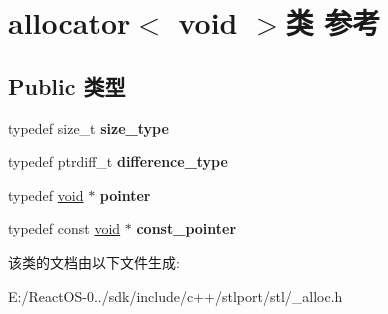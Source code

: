 \hypertarget{classallocator_3_01void_01_4}{}\section{allocator$<$ void $>$类 参考}
\label{classallocator_3_01void_01_4}
\subsection*{Public 类型}
\begin{DoxyCompactItemize}
\item 
\mbox{\label{classallocator_3_01void_01_4_a1d7526f0d0580fc47c5c3202547124f8}} 
typedef size\+\_\+t {\bfseries size\+\_\+type}
\item 
\mbox{\label{classallocator_3_01void_01_4_afe1e6b03e707573d0c2f7fd9c90e0608}} 
typedef ptrdiff\+\_\+t {\bfseries difference\+\_\+type}
\item 
\mbox{\label{classallocator_3_01void_01_4_a73f5bc4d293e6ed9aafe693a6860c7a6}} 
typedef \hyperlink{interfacevoid}{void} $\ast$ {\bfseries pointer}
\item 
\mbox{\label{classallocator_3_01void_01_4_a3b0393d3aa71fe2ba86a4bb2092b6ee9}} 
typedef const \hyperlink{interfacevoid}{void} $\ast$ {\bfseries const\+\_\+pointer}
\end{DoxyCompactItemize}


该类的文档由以下文件生成\+:\begin{DoxyCompactItemize}
\item 
E\+:/\+React\+O\+S-\/0../sdk/include/c++/stlport/stl/\+\_\+alloc.\+h\end{DoxyCompactItemize}
